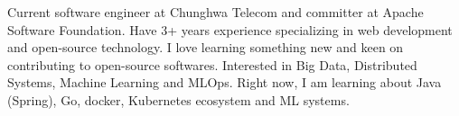 

\begin{cvparagraph}

Current software engineer at Chunghwa Telecom and committer at Apache Software Foundation. Have 3+ years experience specializing in web development and open-source technology. I love learning something new and keen on contributing to open-source softwares. Interested in Big Data, Distributed Systems, Machine Learning and MLOps. Right now, I am learning about Java (Spring), Go, docker, Kubernetes ecosystem and ML systems.
\end{cvparagraph}
